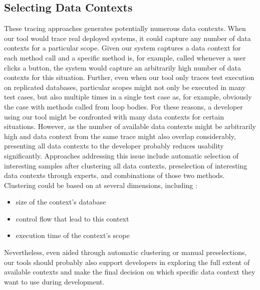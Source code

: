 \subsection{Selecting Data Contexts}
These tracing approaches generates potentially numerous data contexts.
When our tool would trace real deployed systems, it could capture any number of data contexts for a particular scope.
Given our system captures a data context for each method call and a specific method is, for example, called whenever a user clicks a button, the system would capture an arbitrarily high number of data contexts for this situation.
Further, even when our tool only traces test execution on replicated databases, particular scopes might not only be executed in many test cases, but also multiple times in a single test case as, for example, obviously the case with methods called from loop bodies.
For these reasons, a developer using our tool might be confronted with many data contexts for certain situations.
However, as the number of available data contexts might be arbitrarily high and data context from the same trace might also overlap considerably, presenting all data contexts to the developer probably reduces usability significantly. 
Approaches addressing this issue include automatic selection of interesting samples after clustering all data contexts, preselection of interesting data contexts through experts, and combinations of those two methods.
Clustering could be based on at several dimensions, including :
\begin{itemize}
  \item size of the context's database
  \item control flow that lead to this context
  \item execution time of the context's scope
\end{itemize}
Nevertheless, even aided through automatic clustering or manual preselections, our tools should probably also support developers in exploring the full extent of available contexts and make the final decision on which specific data context they want to use during development.